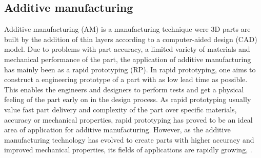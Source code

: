 \subsection{Additive manufacturing}
\label{sec:AM}
Additive manufacturing (AM) is a manufacturing technique were 3D parts are built by the addition of thin layers according to a computer-aided design (CAD) model. Due to problems with part accuracy, a limited variety of materials and mechanical performance of the part, the application of additive manufacturing has mainly been as a rapid prototyping (RP). In rapid prototyping, one aims to construct a engineering prototype of a part with as low lead time as possible. This enables the engineers and designers to perform tests and get a physical feeling of the part early on in the design process. As rapid prototyping usually value fast part delivery and complexity of the part over specific materials, accuracy or mechanical properties, rapid prototyping has proved to be an ideal area of application for additive manufacturing. However, as the additive manufacturing technology has evolved to create parts with higher accuracy and improved mechanical properties, its fields of applications are rapidly growing, \citep{Manufacturing}.

